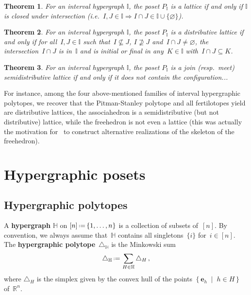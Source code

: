 \documentclass[reqno]{amsart}
\newtheorem{theoremA}{Theorem}
\theoremstyle{definition}
\newcommand{\R}{\mathbb{R}} %
\renewcommand{\b}[1]{\boldsymbol{#1}} %
\newcommand{\set}[2]{\left\{ #1 \;\middle|\; #2 \right\}} %
\newcommand{\eqdef}{\mbox{\,\raisebox{0.2ex}{\scriptsize\ensuremath{\mathrm:}}\ensuremath{=}\,}} %
\newcommand{\simplex}{\triangle} %
\newcommand{\ie}{\textit{i.e.}~} %
\newcommand{\defn}[1]{\textbf{\textsf{\color{PineGreen} #1}}} %
\newcommand{\vincent}[1]{\todo[color=blue!30]{#1 \\ \hfill --- V.}}
\newcommand{\HH}{\mathbb H}  %
\newcommand{\II}{\mathbb I} %
\begin{document}
\begin{theoremA}
\label{thm:latticeI}
For an interval hypergraph $\II$, the poset $P_\II$ is a lattice if and only if $\II$ is closed under intersection (\ie $I, J \in \II \Rightarrow I \cap J \in \II \cup \{\varnothing\}$).
\end{theoremA}

\begin{theoremA}
\label{thm:distributiveLatticeI}
For an interval hypergraph $\II$, the poset $P_\II$ is a distributive lattice if and only if for all~$I, J \in \II$ such that~$I \not\subseteq J$, $I \not\supseteq J$ and~$I \cap J \ne \varnothing$, the intersection~$I \cap J$ is in~$\II$ and is initial or final in any~$K \in \II$ with~$I \cap J \subseteq K$.
\end{theoremA}

\begin{theoremA}
\label{thm:semidistributiveLatticeI}
For an interval hypergraph $\II$, the poset $P_\II$ is a join (resp.~meet) semidistributive lattice if and only if it does not contain the configuration...
\vincent{todo}
\end{theoremA}

For instance, among the four above-mentioned families of interval hypergraphic polytopes, we recover that  the Pitman-Stanley polytope and all fertilotopes yield are distributive lattices, the associahedron is a semidistributive (but not distributive) lattice, while the freehedron is not even a lattice (this was actually the motivation for~\cite{PilaudPoliakova} to construct alternative realizations of the skeleton of the freehedron).

\vincent{In progress}

\setcounter{theoremA}{0}


\section{Hypergraphic posets}
\label{sec:HP}


\subsection{Hypergraphic polytopes}
\label{subsec:D_H}

A \defn{hypergraph} $\HH$ on $[n] \eqdef \{1, \dots, n\}$ is a collection of  subsets of~$[n]$.
By convention, we always assume that~$\HH$ contains all singletons~$\{i\}$ for~$i\in [n]$.
The \defn{hypergraphic polytope}~$\simplex_\HH$ is the Minkowski sum
\[
\simplex_\HH \eqdef \sum_{H\in \HH} \simplex_H\,,
\]
where $\simplex_H$ is the simplex given by the convex hull of the points $\set{\b{e}_h}{h \in H}$ of~$\R^n$.
\end{document}
